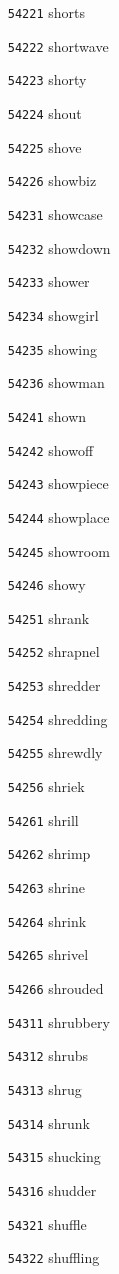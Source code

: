 \documentclass[twoside,11pt]{article}
\begin{document}
\begin{multicols}{5}
\begin{enumerate}
\item[\texttt{54221}] shorts
\item[\texttt{54222}] shortwave
\item[\texttt{54223}] shorty
\item[\texttt{54224}] shout
\item[\texttt{54225}] shove
\item[\texttt{54226}] showbiz
\item[\texttt{54231}] showcase
\item[\texttt{54232}] showdown
\item[\texttt{54233}] shower
\item[\texttt{54234}] showgirl
\item[\texttt{54235}] showing
\item[\texttt{54236}] showman
\item[\texttt{54241}] shown
\item[\texttt{54242}] showoff
\item[\texttt{54243}] showpiece
\item[\texttt{54244}] showplace
\item[\texttt{54245}] showroom
\item[\texttt{54246}] showy
\item[\texttt{54251}] shrank
\item[\texttt{54252}] shrapnel
\item[\texttt{54253}] shredder
\item[\texttt{54254}] shredding
\item[\texttt{54255}] shrewdly
\item[\texttt{54256}] shriek
\item[\texttt{54261}] shrill
\item[\texttt{54262}] shrimp
\item[\texttt{54263}] shrine
\item[\texttt{54264}] shrink
\item[\texttt{54265}] shrivel
\item[\texttt{54266}] shrouded
\item[\texttt{54311}] shrubbery
\item[\texttt{54312}] shrubs
\item[\texttt{54313}] shrug
\item[\texttt{54314}] shrunk
\item[\texttt{54315}] shucking
\item[\texttt{54316}] shudder
\item[\texttt{54321}] shuffle
\item[\texttt{54322}] shuffling

\end{enumerate}
\end{multicols}
\end{document}
